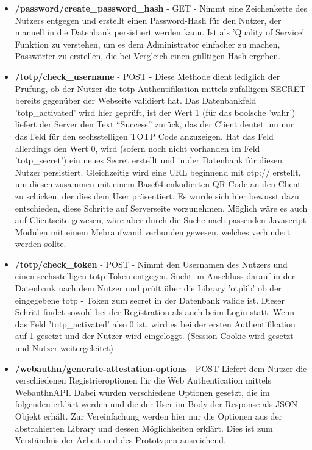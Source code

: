 \begin{enumerate}
\begin{itemize}
 \item \textbf{/password/create\_password\_hash} - GET - Nimmt eine Zeichenkette des Nutzers entgegen und erstellt einen Password-Hash für den Nutzer, der manuell in die Datenbank persistiert werden kann. Ist als 'Quality of Service' Funktion zu verstehen, um es dem Administrator einfacher zu machen, Passwörter zu erstellen, die bei Vergleich einen gülltigen Hash ergeben.
 
 \item \textbf{/totp/check\_username} - POST - Diese Methode dient lediglich der Prüfung, ob der Nutzer die \ac{totp} Authentifikation mittels zufälligem SECRET bereits gegenüber der Webseite validiert hat. Das Datenbankfeld 'totp\_activated' wird hier geprüft, ist der Wert 1 (für das boolsche 'wahr') liefert der Server den Text ``Success'' zurück, das der Client deutet um nur das Feld für den sechsstelligen TOTP Code anzuzeigen. Hat das Feld allerdings den Wert 0, wird (sofern noch nicht vorhanden im Feld 'totp\_secret') ein neues Secret erstellt und in der Datenbank für diesen Nutzer persistiert. Gleichzeitig wird eine URL beginnend mit otp:// erstellt, um diesen zusammen mit einem Base64 enkodierten QR Code an den Client zu schicken, der dies dem User präsentiert. Es wurde sich hier bewusst dazu entschieden, diese Schritte auf Serverseite vorzunehmen. Möglich wäre es auch auf Clientseite gewesen, wäre aber durch die Suche nach passenden Javascript Modulen mit einem Mehraufwand verbunden gewesen, welches verhindert werden sollte.
 
 \item \textbf{/totp/check\_token} - POST - Nimmt den Usernamen des Nutzers und einen sechsstelligen \ac{totp} Token entgegen. Sucht im Anschluss darauf in der Datenbank nach dem Nutzer und prüft über die Library 'otplib' ob der eingegebene \ac{totp} - Token zum secret in der Datenbank valide ist. Dieser Schritt findet sowohl bei der Registration als auch beim Login statt. Wenn das Feld 'totp\_activated' also 0 ist, wird es bei der ersten Authentifikation auf 1 gesetzt und der Nutzer wird eingeloggt. (Session-Cookie wird gesetzt und Nutzer weitergeleitet)
 \newpage

 \item \textbf{/webauthn/generate-attestation-options} - POST
 Liefert dem Nutzer die verschiedenen Registrieroptionen für die Web Authentication mittels WebauthnAPI. Dabei wurden verschiedene Optionen gesetzt, die im folgenden erklärt werden und die der User im Body der Response als JSON - Objekt erhält. Zur Vereinfachung werden hier nur die Optionen aus der abstrahierten Library und dessen Möglichkeiten erklärt. Dies ist zum Verständnis der Arbeit und des Prototypen ausreichend.
 

\end{itemize}
\end{enumerate}
